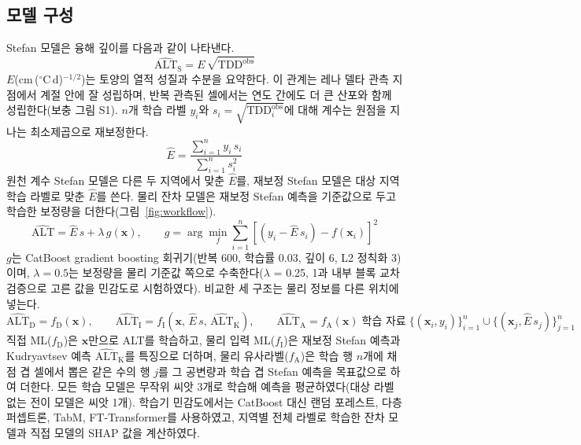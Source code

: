 \subsection{모델 구성}
Stefan 모델은 융해 깊이를 다음과 같이 나타낸다.
\begin{equation}
\widehat{\mathrm{ALT}}_{\mathrm{S}} = E\,\sqrt{\mathrm{TDD}^{\mathrm{obs}}}
\label{eq:stefan}
\end{equation}
$E$(cm\,($^\circ$C\,d)$^{-1/2}$)는 토양의 열적 성질과 수분을 요약한다\cite{Stefan1891,Riseborough2008}. 이 관계는 레나 델타 관측 지점에서 계절 안에 잘 성립하며, 반복 관측된 셀에서는 연도 간에도 더 큰 산포와 함께 성립한다(보충 그림 S1). $n$개 학습 라벨 $y_i$와 $s_i = \sqrt{\mathrm{TDD}^{\mathrm{obs}}_i}$에 대해 계수는 원점을 지나는 최소제곱으로 재보정한다.
\begin{equation}
\hat{E} = \frac{\sum_{i=1}^{n} y_i\, s_i}{\sum_{i=1}^{n} s_i^{2}}
\label{eq:E}
\end{equation}
원천 계수 Stefan 모델은 다른 두 지역에서 맞춘 $\hat{E}$를, 재보정 Stefan 모델은 대상 지역 학습 라벨로 맞춘 $\hat{E}$를 쓴다. 물리 잔차 모델은 재보정 Stefan 예측을 기준값으로 두고 학습한 보정량을 더한다(그림~\ref{fig:workflow}).
\begin{equation}
\widehat{\mathrm{ALT}} = \hat{E}\, s + \lambda\, g(\mathbf{x}), \qquad g = \arg\min_{f} \sum_{i=1}^{n} \left[ \left( y_i - \hat{E}\, s_i \right) - f(\mathbf{x}_i) \right]^{2}
\label{eq:residual}
\end{equation}
$g$는 CatBoost gradient boosting 회귀기\cite{Prokhorenkova2018}(반복 600, 학습률 0.03, 깊이 6, L2 정칙화 3)이며, $\lambda=0.5$는 보정량을 물리 기준값 쪽으로 수축한다($\lambda$ = 0.25, 1과 내부 블록 교차검증으로 고른 값을 민감도로 시험하였다). 비교한 세 구조는 물리 정보를 다른 위치에 넣는다.
\begin{equation}
\widehat{\mathrm{ALT}}_{\mathrm{D}} = f_{\mathrm{D}}(\mathbf{x}), \qquad
\widehat{\mathrm{ALT}}_{\mathrm{I}} = f_{\mathrm{I}}\!\left(\mathbf{x},\, \hat{E}\,s,\, \widehat{\mathrm{ALT}}_{\mathrm{K}}\right), \qquad
\widehat{\mathrm{ALT}}_{\mathrm{A}} = f_{\mathrm{A}}(\mathbf{x}) \;\text{학습 자료}\; \{(\mathbf{x}_i, y_i)\}_{i=1}^{n} \cup \{(\mathbf{x}_j, \hat{E}\,s_j)\}_{j=1}^{n}
\label{eq:alt}
\end{equation}
직접 ML($f_{\mathrm{D}}$)은 $\mathbf{x}$만으로 ALT를 학습하고, 물리 입력 ML($f_{\mathrm{I}}$)은 재보정 Stefan 예측과 Kudryavtsev\cite{Kudryavtsev1974} 예측 $\widehat{\mathrm{ALT}}_{\mathrm{K}}$를 특징으로 더하며, 물리 유사라벨($f_{\mathrm{A}}$)은 학습 행 $n$개에 채점 겹 셀에서 뽑은 같은 수의 행 $j$를 그 공변량과 학습 겹 Stefan 예측을 목표값으로 하여 더한다. 모든 학습 모델은 무작위 씨앗 3개로 학습해 예측을 평균하였다(대상 라벨 없는 전이 모델은 씨앗 1개). 학습기 민감도에서는 CatBoost 대신 랜덤 포레스트, 다층 퍼셉트론, TabM, FT-Transformer\cite{Gorishniy2021,Gorishniy2025,Holzmuller2024}를 사용하였고, 지역별 전체 라벨로 학습한 잔차 모델과 직접 모델의 SHAP 값\cite{Lundberg2017}을 계산하였다.

